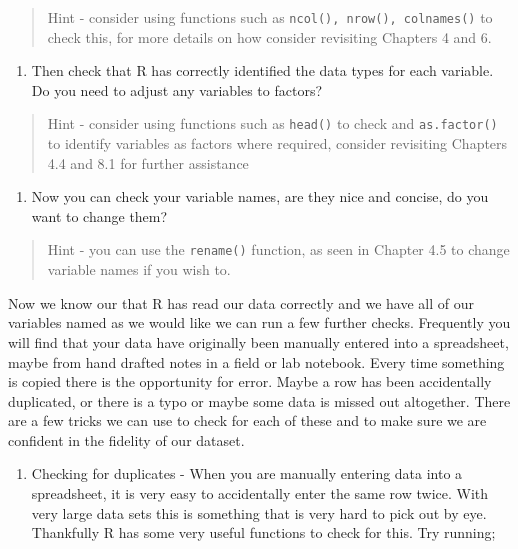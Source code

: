 \documentclass[
]{book}
\providecommand{\tightlist}{%
  \setlength{\itemsep}{0pt}\setlength{\parskip}{0pt}}
\begin{document}
\begin{quote}
Hint - consider using functions such as \texttt{ncol(),\ nrow(),\ colnames()} to check this, for more details on how consider revisiting Chapters 4 and 6.
\end{quote}

\begin{enumerate}
\def\labelenumi{\arabic{enumi})}
\setcounter{enumi}{1}
\tightlist
\item
  Then check that R has correctly identified the data types for each variable. Do you need to adjust any variables to factors?
\end{enumerate}

\begin{quote}
Hint - consider using functions such as \texttt{head()} to check and \texttt{as.factor()} to identify variables as factors where required, consider revisiting Chapters 4.4 and 8.1 for further assistance
\end{quote}

\begin{enumerate}
\def\labelenumi{\arabic{enumi})}
\setcounter{enumi}{2}
\tightlist
\item
  Now you can check your variable names, are they nice and concise, do you want to change them?
\end{enumerate}

\begin{quote}
Hint - you can use the \texttt{rename()} function, as seen in Chapter 4.5 to change variable names if you wish to.
\end{quote}

Now we know our that R has read our data correctly and we have all of our variables named as we would like we can run a few further checks. Frequently you will find that your data have originally been manually entered into a spreadsheet, maybe from hand drafted notes in a field or lab notebook. Every time something is copied there is the opportunity for error. Maybe a row has been accidentally duplicated, or there is a typo or maybe some data is missed out altogether. There are a few tricks we can use to check for each of these and to make sure we are confident in the fidelity of our dataset.

\begin{enumerate}
\def\labelenumi{\arabic{enumi})}
\tightlist
\item
  Checking for duplicates - When you are manually entering data into a spreadsheet, it is very easy to accidentally enter the same row twice. With very large data sets this is something that is very hard to pick out by eye. Thankfully R has some very useful functions to check for this. Try running;
\end{enumerate}
\end{document}
